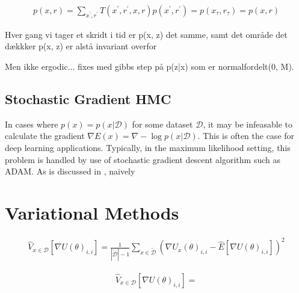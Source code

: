 \begin{align*}
    p(x, r) = \sum_{x^\prime, r^\prime} T(x^\prime, r^\prime, x, r) p(x^\prime, r^\prime) = p(x_\tau, r_\tau) =  p(x, r)
\end{align*}


Hver gang vi tager et skridt i tid er p(x, z) det samme, samt det område det dækkker   p(x, z) er alstå invariant overfor 

Men ikke ergodic... fixes med gibbs step på p(z|x) som er normalfordelt(0, M).


    
\subsection{Stochastic Gradient HMC}

In cases where $p(x) = p(x | \mathcal{D})$ for some dataset $\mathcal{D}$, it may be infeasable to calculate the gradient $\nabla E(x) = \nabla -\log{p(x | \mathcal{D})}$. This is often the case for deep learning applications.
Typically, in the maximum likelihood setting, this problem is handled by use of stochastic gradient descent algorithm such as ADAM.
As is discussed in \cite{chen_stochastic_2014}, naively 

\section{Variational Methods}

\begin{align*}
    \hat V_{x\in \mathcal D}[\nabla U(\theta)_{i,i} ] = \frac{1}{|\tilde{\mathcal{D}}|-1} \sum_{x\in \tilde{\mathcal{D}}} (\nabla U_x(\theta)_{i,i} - \hat{E}[\nabla U(\theta)_{i,i}])^2
\end{align*}

\begin{align*}
    \hat V_{x\in \mathcal D}[\nabla U(\theta)_{i,i} ] = 
\end{align*}